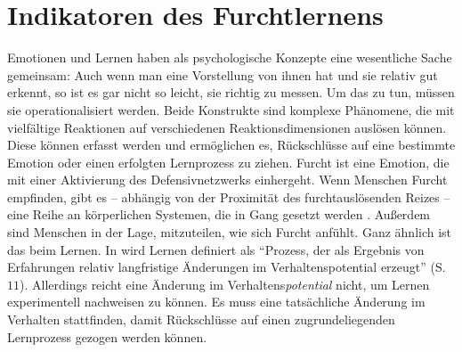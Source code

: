 	
	
\section{Indikatoren des Furchtlernens}	\label{index}
	
	Emotionen und Lernen haben als psychologische Konzepte eine wesentliche Sache gemeinsam: Auch
	wenn man eine Vorstellung von ihnen hat und sie relativ gut erkennt, so ist es gar nicht so leicht, sie richtig zu messen. Um das zu tun, müssen sie operationalisiert werden. 
	Beide Konstrukte sind komplexe Phänomene, die mit vielfältige Reaktionen auf verschiedenen Reaktionsdimensionen auslösen können.
	Diese können erfasst werden und ermöglichen es, Rückschlüsse auf eine bestimmte Emotion oder einen erfolgten Lernprozess zu ziehen.
	Furcht ist eine Emotion, die mit einer Aktivierung des Defensivnetzwerks einhergeht. Wenn Menschen Furcht empfinden, gibt es -- abhängig von der Proximität des furchtauslösenden Reizes -- eine Reihe an körperlichen Systemen, die in Gang gesetzt werden \parencite[zum menschlichen Defensivsystem siehe][]{HAMM2005, HAMM2006, OEHMANN2001}. Außerdem sind Menschen in der Lage, mitzuteilen, wie sich Furcht anfühlt. Ganz ähnlich ist das beim Lernen. In \textcite{KIESEL2012} wird Lernen definiert als "`Prozess, der als Ergebnis von Erfahrungen relativ langfristige Änderungen im Verhaltenspotential erzeugt"' (S. $11$). Allerdings reicht eine Änderung im Verhaltens\textit{potential} nicht, um Lernen experimentell nachweisen zu können. Es muss eine tatsächliche Änderung im Verhalten stattfinden, damit Rückschlüsse auf einen zugrundeliegenden Lernprozess gezogen werden können.
	
